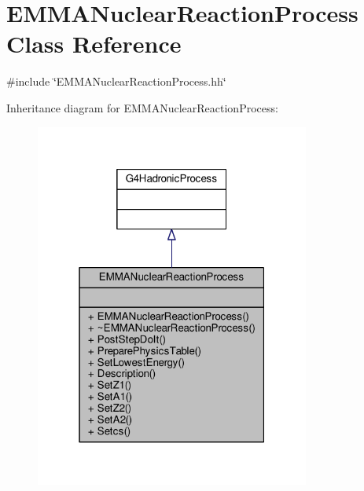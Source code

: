 \hypertarget{classEMMANuclearReactionProcess}{}\section{E\+M\+M\+A\+Nuclear\+Reaction\+Process Class Reference}
\label{classEMMANuclearReactionProcess}


{\ttfamily \#include \char`\"{}E\+M\+M\+A\+Nuclear\+Reaction\+Process.\+hh\char`\"{}}



Inheritance diagram for E\+M\+M\+A\+Nuclear\+Reaction\+Process\+:
\nopagebreak
\begin{figure}[H]
\begin{center}
\leavevmode
\includegraphics[width=256pt]{classEMMANuclearReactionProcess__inherit__graph}
\end{center}
\end{figure}


